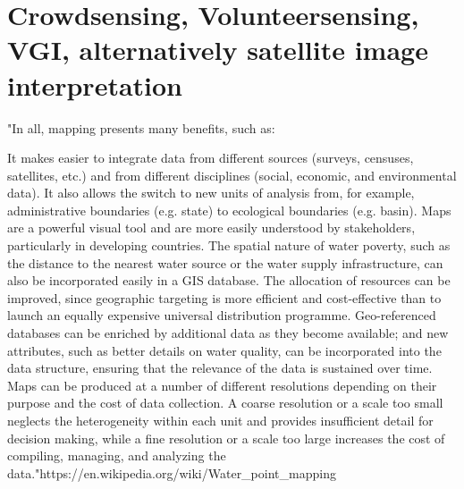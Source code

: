 {%


\section{Crowdsensing, Volunteersensing, VGI,  alternatively satellite image interpretation}



"In all, mapping presents many benefits, such as:

It makes easier to integrate data from different sources (surveys, censuses, satellites, etc.) and from different disciplines (social, economic, and environmental data). It also allows the switch to new units of analysis from, for example, administrative boundaries (e.g. state) to ecological boundaries (e.g. basin).
Maps are a powerful visual tool and are more easily understood by stakeholders, particularly in developing countries.
The spatial nature of water poverty, such as the distance to the nearest water source or the water supply infrastructure, can also be incorporated easily in a GIS database.
The allocation of resources can be improved, since geographic targeting is more efficient and cost-effective than to launch an equally expensive universal distribution programme.
Geo-referenced databases can be enriched by additional data as they become available; and new attributes, such as better details on water quality, can be incorporated into the data structure, ensuring that the relevance of the data is sustained over time.
Maps can be produced at a number of different resolutions depending on their purpose and the cost of data collection. A coarse resolution or a scale too small neglects the heterogeneity within each unit and provides insufficient detail for decision making, while a fine resolution or a scale too large increases the cost of compiling, managing, and analyzing the data."https://en.wikipedia.org/wiki/Water_point_mapping

}
